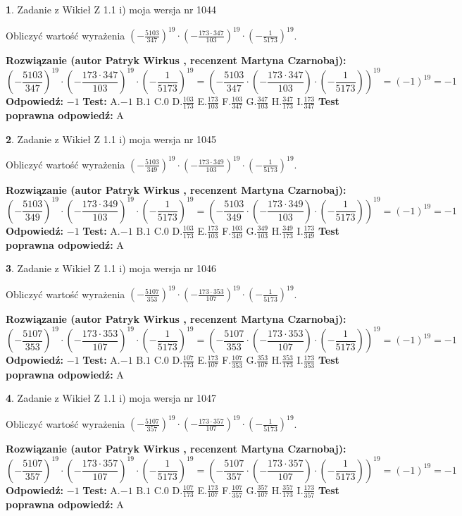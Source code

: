 \documentclass[12pt, a4paper]{article}
\theoremstyle{definition} %
\newtheorem{zad}{}
\newcommand{\zadStart}[1]{\begin{zad}#1\newline}
\newcommand{\zadStop}{\end{zad}}
\newcommand{\rozwStart}[2]{\noindent \textbf{Rozwiązanie (autor #1 , recenzent #2): }\newline}
\newcommand{\rozwStop}{\newline}
\newcommand{\odpStart}{\noindent \textbf{Odpowiedź:}\newline}
\newcommand{\odpStop}{\newline}
\newcommand{\testStart}{\noindent \textbf{Test:}\newline}
\newcommand{\testStop}{\newline}
\newcommand{\kluczStart}{\noindent \textbf{Test poprawna odpowiedź:}\newline}
\newcommand{\kluczStop}{\newline}
\begin{document}
\zadStart{Zadanie z Wikieł Z 1.1 i) moja wersja nr 1044}

Obliczyć wartość wyrażenia $(-\frac{5103}{347})^{19} \cdot (-\frac{173 \cdot 347}{103})^{19} \cdot (-\frac{1}{5173})^{19}$.
\zadStop
\rozwStart{Patryk Wirkus}{Martyna Czarnobaj}
$$(-\frac{5103}{347})^{19} \cdot (-\frac{173 \cdot 347}{103})^{19} \cdot (-\frac{1}{5173})^{19} = (-\frac{5103}{347} \cdot (-\frac{173 \cdot 347}{103}) \cdot (-\frac{1}{5173}))^{19} = (-1)^{19} = -1$$
\rozwStop
\odpStart
$-1$
\odpStop
\testStart
A.$-1$ B.$1$ C.$0$ D.$\frac{103}{173}$ E.$\frac{173}{103}$
F.$\frac{103}{347}$ G.$\frac{347}{103}$
H.$\frac{347}{173}$
I.$\frac{173}{347}$
\testStop
\kluczStart
A
\kluczStop



\zadStart{Zadanie z Wikieł Z 1.1 i) moja wersja nr 1045}

Obliczyć wartość wyrażenia $(-\frac{5103}{349})^{19} \cdot (-\frac{173 \cdot 349}{103})^{19} \cdot (-\frac{1}{5173})^{19}$.
\zadStop
\rozwStart{Patryk Wirkus}{Martyna Czarnobaj}
$$(-\frac{5103}{349})^{19} \cdot (-\frac{173 \cdot 349}{103})^{19} \cdot (-\frac{1}{5173})^{19} = (-\frac{5103}{349} \cdot (-\frac{173 \cdot 349}{103}) \cdot (-\frac{1}{5173}))^{19} = (-1)^{19} = -1$$
\rozwStop
\odpStart
$-1$
\odpStop
\testStart
A.$-1$ B.$1$ C.$0$ D.$\frac{103}{173}$ E.$\frac{173}{103}$
F.$\frac{103}{349}$ G.$\frac{349}{103}$
H.$\frac{349}{173}$
I.$\frac{173}{349}$
\testStop
\kluczStart
A
\kluczStop



\zadStart{Zadanie z Wikieł Z 1.1 i) moja wersja nr 1046}

Obliczyć wartość wyrażenia $(-\frac{5107}{353})^{19} \cdot (-\frac{173 \cdot 353}{107})^{19} \cdot (-\frac{1}{5173})^{19}$.
\zadStop
\rozwStart{Patryk Wirkus}{Martyna Czarnobaj}
$$(-\frac{5107}{353})^{19} \cdot (-\frac{173 \cdot 353}{107})^{19} \cdot (-\frac{1}{5173})^{19} = (-\frac{5107}{353} \cdot (-\frac{173 \cdot 353}{107}) \cdot (-\frac{1}{5173}))^{19} = (-1)^{19} = -1$$
\rozwStop
\odpStart
$-1$
\odpStop
\testStart
A.$-1$ B.$1$ C.$0$ D.$\frac{107}{173}$ E.$\frac{173}{107}$
F.$\frac{107}{353}$ G.$\frac{353}{107}$
H.$\frac{353}{173}$
I.$\frac{173}{353}$
\testStop
\kluczStart
A
\kluczStop



\zadStart{Zadanie z Wikieł Z 1.1 i) moja wersja nr 1047}

Obliczyć wartość wyrażenia $(-\frac{5107}{357})^{19} \cdot (-\frac{173 \cdot 357}{107})^{19} \cdot (-\frac{1}{5173})^{19}$.
\zadStop
\rozwStart{Patryk Wirkus}{Martyna Czarnobaj}
$$(-\frac{5107}{357})^{19} \cdot (-\frac{173 \cdot 357}{107})^{19} \cdot (-\frac{1}{5173})^{19} = (-\frac{5107}{357} \cdot (-\frac{173 \cdot 357}{107}) \cdot (-\frac{1}{5173}))^{19} = (-1)^{19} = -1$$
\rozwStop
\odpStart
$-1$
\odpStop
\testStart
A.$-1$ B.$1$ C.$0$ D.$\frac{107}{173}$ E.$\frac{173}{107}$
F.$\frac{107}{357}$ G.$\frac{357}{107}$
H.$\frac{357}{173}$
I.$\frac{173}{357}$
\testStop
\kluczStart
A
\kluczStop
\end{document}
